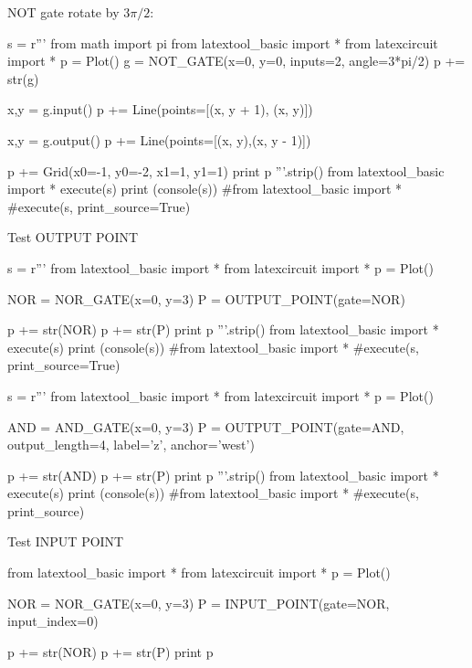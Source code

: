 NOT gate rotate by $3\pi/2$:
\begin{python}
s = r'''
from math import pi
from latextool_basic import *
from latexcircuit import *
p = Plot()
g = NOT_GATE(x=0, y=0, inputs=2, angle=3*pi/2)
p += str(g)

x,y = g.input()
p += Line(points=[(x, y + 1), (x, y)])

x,y = g.output()
p += Line(points=[(x, y),(x, y - 1)])

p += Grid(x0=-1, y0=-2, x1=1, y1=1)
print p
'''.strip()
from latextool_basic import *
execute(s)
print (console(s))
#from latextool_basic import *
#execute(s, print_source=True)
\end{python}



\newpage
Test OUTPUT POINT
\begin{python}
s = r'''
from latextool_basic import *
from latexcircuit import *
p = Plot()

NOR = NOR_GATE(x=0, y=3)
P = OUTPUT_POINT(gate=NOR)

p += str(NOR)
p += str(P)
print p
'''.strip()
from latextool_basic import *
execute(s)
print (console(s))
#from latextool_basic import *
#execute(s, print_source=True)
\end{python}

\begin{python}
s = r'''
from latextool_basic import *
from latexcircuit import *
p = Plot()

AND = AND_GATE(x=0, y=3)
P = OUTPUT_POINT(gate=AND, output_length=4, label='z', anchor='west')

p += str(AND)
p += str(P)
print p
'''.strip()
from latextool_basic import *
execute(s)
print (console(s))
#from latextool_basic import *
#execute(s, print_source)
\end{python}






\newpage
Test INPUT POINT
\begin{python}
from latextool_basic import *
from latexcircuit import *
p = Plot()

NOR = NOR_GATE(x=0, y=3)
P = INPUT_POINT(gate=NOR, input_index=0)

p += str(NOR)
p += str(P)
print p
\end{python}


